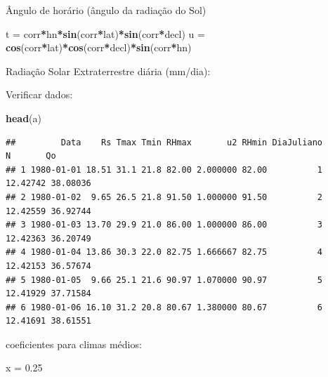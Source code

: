 \documentclass[
]{book}
\newenvironment{Shaded}{\begin{snugshade}}{\end{snugshade}}
\newcommand{\FloatTok}[1]{\textcolor[rgb]{0.00,0.00,0.81}{#1}}
\newcommand{\KeywordTok}[1]{\textcolor[rgb]{0.13,0.29,0.53}{\textbf{#1}}}
\newcommand{\NormalTok}[1]{#1}
\newcommand{\OperatorTok}[1]{\textcolor[rgb]{0.81,0.36,0.00}{\textbf{#1}}}
\newcommand{\StringTok}[1]{\textcolor[rgb]{0.31,0.60,0.02}{#1}}
\begin{document}
Ângulo de horário (ângulo da radiação do Sol)

\begin{Shaded}
\begin{Highlighting}[]
\NormalTok{t =}\StringTok{ }\NormalTok{corr}\OperatorTok{*}\NormalTok{hn}\OperatorTok{*}\KeywordTok{sin}\NormalTok{(corr}\OperatorTok{*}\NormalTok{lat)}\OperatorTok{*}\KeywordTok{sin}\NormalTok{(corr}\OperatorTok{*}\NormalTok{decl) }
\NormalTok{u =}\StringTok{ }\KeywordTok{cos}\NormalTok{(corr}\OperatorTok{*}\NormalTok{lat)}\OperatorTok{*}\KeywordTok{cos}\NormalTok{(corr}\OperatorTok{*}\NormalTok{decl)}\OperatorTok{*}\KeywordTok{sin}\NormalTok{(corr}\OperatorTok{*}\NormalTok{hn)}
\end{Highlighting}
\end{Shaded}

Radiação Solar Extraterrestre diária (mm/dia):

\begin{Shaded}
\end{Shaded}

Verificar dados:

\begin{Shaded}
\begin{Highlighting}[]
\KeywordTok{head}\NormalTok{(a)}
\end{Highlighting}
\end{Shaded}

\begin{verbatim}
##         Data    Rs Tmax Tmin RHmax       u2 RHmin DiaJuliano        N       Qo
## 1 1980-01-01 18.51 31.1 21.8 82.00 2.000000 82.00          1 12.42742 38.08036
## 2 1980-01-02  9.65 26.5 21.8 91.50 1.000000 91.50          2 12.42559 36.92744
## 3 1980-01-03 13.70 29.9 21.0 86.00 1.000000 86.00          3 12.42363 36.20749
## 4 1980-01-04 13.86 30.3 22.0 82.75 1.666667 82.75          4 12.42153 36.57674
## 5 1980-01-05  9.66 25.1 21.6 90.97 1.070000 90.97          5 12.41929 37.71584
## 6 1980-01-06 16.10 31.2 20.8 80.67 1.380000 80.67          6 12.41691 38.61551
\end{verbatim}

coeficientes para climas médios:

\begin{Shaded}
\begin{Highlighting}[]
\NormalTok{x =}\StringTok{ }\FloatTok{0.25}
\end{Highlighting}
\end{Shaded}
\end{document}

